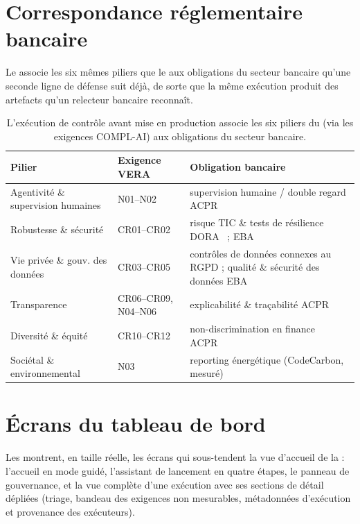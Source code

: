 \documentclass[10pt,conference]{IEEEtran}
\newcommand{\tblsetup}{%
  \footnotesize%
  \setlength{\tabcolsep}{3pt}%
  \renewcommand{\arraystretch}{1.02}%
}
\begin{document}
\section{Correspondance réglementaire bancaire}
\label{app:banking}
Le  associe les six mêmes piliers que le  aux obligations du secteur bancaire qu'une seconde ligne de défense suit déjà, de sorte que la même exécution produit des artefacts qu'un relecteur bancaire reconnaît.

\begin{table}[h]
  \caption{L'exécution de contrôle avant mise en production associe les six piliers du  (via les exigences COMPL-AI) aux obligations du secteur bancaire.}
  \label{tab:banking-map}
  \centering
  \tblsetup
  \begin{tabularx}{\columnwidth}{@{}l l X@{}}
    \toprule
    Pilier & Exigence VERA & Obligation bancaire \\
    \midrule
    Agentivité \& supervision humaines & N01--N02 & supervision humaine / double regard ACPR~\cite{acpr2020ai} \\
    Robustesse \& sécurité & CR01--CR02 & risque TIC \& tests de résilience DORA~\cite{dora2022} ; EBA~\cite{eba2021ictrisk} \\
    Vie privée \& gouv. des données & CR03--CR05 & contrôles de données connexes au RGPD ; qualité \& sécurité des données EBA~\cite{eba2021ictrisk} \\
    Transparence & CR06--CR09, N04--N06 & explicabilité \& traçabilité ACPR~\cite{acpr2020ai} \\
    Diversité \& équité & CR10--CR12 & non-discrimination en finance ACPR~\cite{acpr2020ai} \\
    Sociétal \& environnemental & N03 & reporting énergétique (CodeCarbon, mesuré) \\
    \bottomrule
  \end{tabularx}
\end{table}

\section{Écrans du tableau de bord}
\label{app:dashboard}
Les  montrent, en taille réelle, les écrans qui sous-tendent la vue d'accueil de la  : l'accueil en mode guidé, l'assistant de lancement en quatre étapes, le panneau de gouvernance, et la vue complète d'une exécution avec ses sections de détail dépliées (triage, bandeau des exigences non mesurables, métadonnées d'exécution et provenance des exécuteurs).
\end{document}
